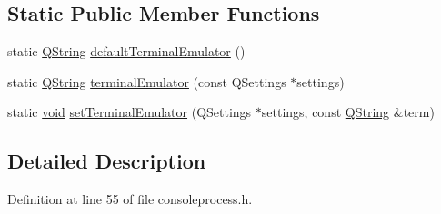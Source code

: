 \subsection*{Static Public Member Functions}
\begin{DoxyCompactItemize}
\item 
static \hyperlink{group___u_a_v_objects_plugin_gab9d252f49c333c94a72f97ce3105a32d}{Q\-String} \hyperlink{class_utils_1_1_console_process_ac1c6c784e1cc19c6842cec0f5bc00162}{default\-Terminal\-Emulator} ()
\item 
static \hyperlink{group___u_a_v_objects_plugin_gab9d252f49c333c94a72f97ce3105a32d}{Q\-String} \hyperlink{class_utils_1_1_console_process_a157017d2d631838fd521c9c69efd04d2}{terminal\-Emulator} (const Q\-Settings $\ast$settings)
\item 
static \hyperlink{group___u_a_v_objects_plugin_ga444cf2ff3f0ecbe028adce838d373f5c}{void} \hyperlink{class_utils_1_1_console_process_a38d5ca0fa3b66525512debc37e538c9c}{set\-Terminal\-Emulator} (Q\-Settings $\ast$settings, const \hyperlink{group___u_a_v_objects_plugin_gab9d252f49c333c94a72f97ce3105a32d}{Q\-String} \&term)
\end{DoxyCompactItemize}


\subsection{Detailed Description}


Definition at line 55 of file consoleprocess.\-h.



